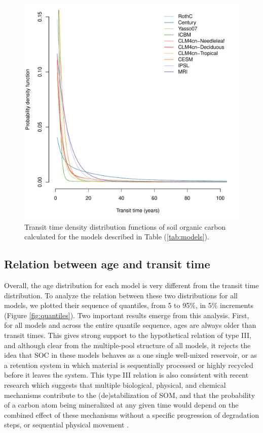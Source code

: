 \documentclass[draft,linenumbers]{agujournal}
\begin{document}
\begin{figure}[t]
   \centering
   \includegraphics[scale=0.75]{Figures/modelsTT} %
   \caption{Transit time density distribution functions of soil organic carbon calculated for the models described in Table (\ref{tab:models}).}
   \label{fig:ttDensity}
\end{figure}

\subsection{Relation between age and transit time}
Overall, the age distribution for each model is very different from the transit time distribution. To analyze the relation between these two distributions for all models, we plotted their sequence of  quantiles, from 5 to 95\%, in 5\% increments (Figure \ref{fig:quantiles}). Two important results emerge from this analysis. First, for all models and across the entire quantile sequence, ages are always older than transit times. This gives strong support to the hypothetical relation of type III, and although clear from the multiple-pool structure of all models, it  rejects the idea that SOC in these models behaves as a one single well-mixed reservoir, or as a retention system in which material is sequentially processed or highly recycled before it leaves the system. This type III relation is also consistent with recent research which suggests that multiple biological, physical, and chemical mechanisms contribute to the (de)stabilization of SOM, and that the probability of a carbon atom being mineralized at any given time would depend on the combined effect of these mechanisms without a specific progression of degradation steps, or sequential physical movement \citep{LehmannKleber}. 
\end{document}
